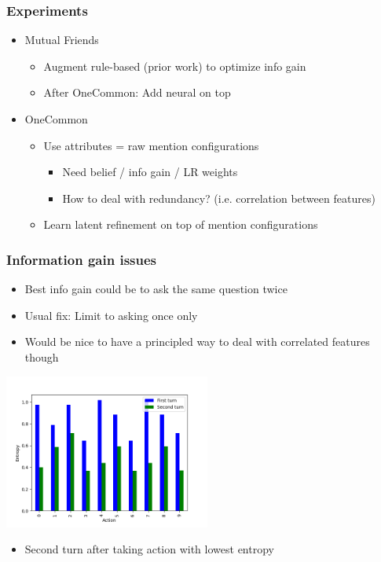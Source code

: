 \documentclass{beamer}
\begin{document}
\begin{frame}
\frametitle{Experiments}
\begin{itemize}
\item Mutual Friends
    \begin{itemize}
    \item Augment rule-based (prior work) to optimize info gain
    \item After OneCommon: Add neural on top
    \end{itemize}
\item OneCommon
    \begin{itemize}
    \item Use attributes = raw mention configurations
        \begin{itemize}
        \item Need belief / info gain / LR weights
        \item How to deal with redundancy? (i.e. correlation between features)
        \end{itemize}
    \item Learn latent refinement on top of mention configurations
    \end{itemize}
\end{itemize}
\end{frame}

\begin{frame}
\frametitle{Information gain issues}
\begin{itemize}
\item Best info gain could be to ask the same question twice
\item Usual fix: Limit to asking once only
\item Would be nice to have a principled way to deal with correlated
    features though
\end{itemize}
\centering
\includegraphics[height=2in]{src/entropy.png}
\begin{itemize}
\item Second turn after taking action with lowest entropy
\end{itemize}
\end{frame}
\end{document}
